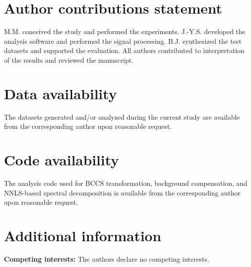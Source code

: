 \documentclass[pdflatex,sn-mathphys-num, table]{sn-jnl}%
\theoremstyle{thmstyleone}%
\theoremstyle{thmstyletwo}%
\theoremstyle{thmstylethree}%
\begin{document}
\section*{Author contributions statement}
M.M. conceived the study and performed the experiments. J.-Y.S. developed the analysis software and performed the signal processing. B.J. synthesized the test datasets and supported the evaluation. All authors contributed to interpretation of the results and reviewed the manuscript.

\section*{Data availability}
The datasets generated and/or analyzed during the current study are available from the corresponding author upon reasonable request.

\section*{Code availability}
The analysis code used for BCCS transformation, background compensation, and NNLS-based spectral decomposition is available from the corresponding author upon reasonable request.

\section*{Additional information}

\textbf{Competing interests:} The authors declare no competing interests.



\clearpage
\end{document}
